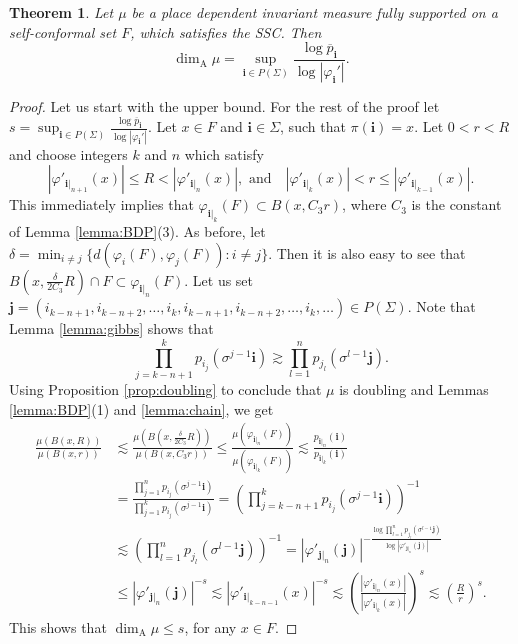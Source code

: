 \documentclass{PRM}
\theoremstyle{plain}
\newtheorem{thm}{Theorem}[section]
\theoremstyle{definition}
\theoremstyle{remark}
\begin{document}
\begin{thm}\label{thm:pw_ssc_formula}
Let $\mu$ be a place dependent invariant measure fully supported on a self-conformal set $F$, which satisfies the SSC. Then
\begin{equation*}
    \dim_{\mathrm{A}}\mu=\sup_{\mathbf{i}\in P(\Sigma)}\frac{\log \overline{p}_{\mathbf{i}}}{\log |\varphi_{\mathbf{i}}'|}.
\end{equation*}
\end{thm}
\begin{proof}
Let us start with the upper bound. For the rest of the proof let $s=\sup_{\mathbf{i}\in P(\Sigma)}\frac{\log \overline{p}_{\mathbf{i}}}{\log |\varphi_{\mathbf{i}}'|}$. Let $x\in F$ and $\mathbf{i}\in\Sigma$, such that $\pi(\mathbf{i})=x$. Let $0<r<R$ and choose integers $k$ and $n$ which satisfy
\begin{equation*}
    |\varphi'_{\mathbf{i}|_{n+1}}(x)|\leq R < |\varphi'_{\mathbf{i}|_{n}}(x)|,\text{ and} \quad |\varphi'_{\mathbf{i}|_{k}}(x)|< r \leq |\varphi'_{\mathbf{i}|_{k-1}}(x)|.
\end{equation*}
This immediately implies that $\varphi_{\mathbf{i}|_k}(F)\subset B(x,C_3r)$, where $C_3$ is the constant of Lemma \ref{lemma:BDP}(3). As before, let $\delta = \min_{i\ne j}\{d(\varphi_i(F),\varphi_j(F))\colon i\ne j\}$. Then it is also easy to see that $B(x,\frac{\delta}{2C_3}R)\cap F\subset \varphi_{\mathbf{i}|_n}(F)$. Let us set $\mathbf{j}=(i_{k-n+1},i_{k-n+2},\ldots,i_k,i_{k-n+1},i_{k-n+2},\ldots,i_k,\ldots)\in P(\Sigma)$. Note that Lemma \ref{lemma:gibbs} shows that
\begin{equation*}
    \prod_{j=k-n+1}^kp_{i_j}(\sigma^{j-1}\mathbf{i})\gtrsim \prod_{l=1}^np_{j_l}(\sigma^{l-1}\mathbf{j}).
\end{equation*}
Using Proposition \ref{prop:doubling} to conclude that $\mu$ is doubling and Lemmas \ref{lemma:BDP}(1) and \ref{lemma:chain}, we get
\begin{align*}
    \frac{\mu(B(x,R))}{\mu(B(x,r))}&\lesssim \frac{\mu(B(x,\frac{\delta}{2C_3}R))}{\mu(B(x,C_3r))}\leq \frac{\mu(\varphi_{\mathbf{i}|_n}(F))}{\mu(\varphi_{\mathbf{i}|_k}(F))}\lesssim \frac{p_{\mathbf{i}|_n}(\mathbf{i})}{p_{\mathbf{i}|_k}(\mathbf{i})}\\
    &=\frac{\prod_{j=1}^np_{i_j}(\sigma^{j-1}\mathbf{i})}{\prod_{j=1}^kp_{i_j}(\sigma^{j-1}\mathbf{i})} =\left(\prod_{j=k-n+1}^kp_{i_j}(\sigma^{j-1}\mathbf{i})\right)^{-1}\\
    &\lesssim\left(\prod_{l=1}^np_{j_l}(\sigma^{l-1}\mathbf{j})\right)^{-1}= |\varphi'_{\mathbf{j}|_n}(\mathbf{j})|^{-\frac{\log \prod_{l=1}^np_{j_l}(\sigma^{l-1}\mathbf{j})}{\log |\varphi'_{\mathbf{j}|_n}(\mathbf{j})|}}\\
    &\leq|\varphi'_{\mathbf{j}|_n}(\mathbf{j})|^{-s}\lesssim  |\varphi'_{\mathbf{i}|_{k-n-1}}(x)|^{-s}\lesssim\left(\frac{|\varphi'_{\mathbf{i}|_{n}}(x)|}{|\varphi'_{\mathbf{i}|_{k}}(x)|}\right)^s\lesssim\left(\frac{R}{r}\right)^s.
\end{align*}
This shows that $\dim_{\mathrm{A}}\mu\leq s$, for any $x\in F$.


\end{proof}
\end{document}
